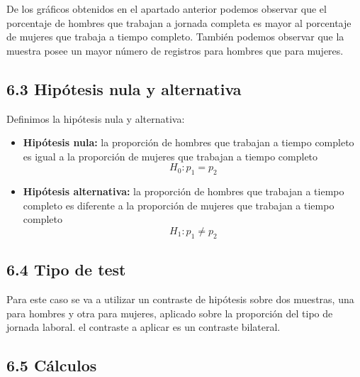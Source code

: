 \documentclass[
  a4paper]{article}
\providecommand{\tightlist}{%
  \setlength{\itemsep}{0pt}\setlength{\parskip}{0pt}}
\begin{document}
De los gráficos obtenidos en el apartado anterior podemos observar que
el porcentaje de hombres que trabajan a jornada completa es mayor al
porcentaje de mujeres que trabaja a tiempo completo. También podemos
observar que la muestra posee un mayor número de registros para hombres
que para mujeres.

\hypertarget{hipuxf3tesis-nula-y-alternativa}{%
\subsection{6.3 Hipótesis nula y
alternativa}\label{hipuxf3tesis-nula-y-alternativa}}

Definimos la hipótesis nula y alternativa:

\begin{itemize}
\tightlist
\item
  \textbf{Hipótesis nula:} la proporción de hombres que trabajan a
  tiempo completo es igual a la proporción de mujeres que trabajan a
  tiempo completo \[H_0: p_1 = p_2\]
\item
  \textbf{Hipótesis alternativa:} la proporción de hombres que trabajan
  a tiempo completo es diferente a la proporción de mujeres que trabajan
  a tiempo completo \[H_1: p_1 ≠ p_2\]
\end{itemize}

\hypertarget{tipo-de-test}{%
\subsection{6.4 Tipo de test}\label{tipo-de-test}}

Para este caso se va a utilizar un contraste de hipótesis sobre dos
muestras, una para hombres y otra para mujeres, aplicado sobre la
proporción del tipo de jornada laboral. el contraste a aplicar es un
contraste bilateral.

\hypertarget{cuxe1lculos-3}{%
\subsection{6.5 Cálculos}\label{cuxe1lculos-3}}
\end{document}
